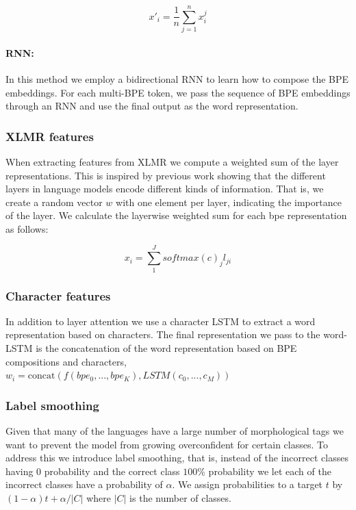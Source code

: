 \documentclass[11pt]{article}
\begin{document}
	\begin{equation}
	x'_{i} = \frac{1}{n}\sum_{j=1}^{n} x_i^j
	\end{equation}
	
	
	\paragraph{RNN:} In this method we employ a bidirectional RNN to learn how to compose the BPE embeddings. For each multi-BPE token, we pass the sequence of BPE embeddings through an RNN and use the final output as the word representation.
	
	\subsubsection{XLMR features}
	
	When extracting features from XLMR we compute a weighted sum of the layer representations. This is inspired by previous work showing that the different layers in language models encode different kinds of information. That is, we create a random vector $w$ with one element per layer, indicating the importance of the layer. We calculate the layerwise weighted sum for each bpe representation as follows:
	
	\begin{equation}
		x_i = \sum_{1}^{J} softmax(c)_j l_{ji}
	\end{equation}
	
	\subsubsection{Character features}
	In addition to layer attention we use a character LSTM to extract a word representation based on characters. The final representation we pass to the word-LSTM is the concatenation of the word representation based on BPE compositions and characters, $w_i = \text{concat}(f(bpe_0,...,bpe_K), LSTM(c_0, ..., c_M))$
	
	\subsubsection{Label smoothing}
	Given that many of the languages have a large number of morphological tags we want to prevent the model from growing overconfident for certain classes. To address this we introduce label smoothing, that is, instead of the incorrect classes having 0 probability and the correct class $100\%$ probability we let each of the incorrect classes have a probability of $\alpha$. We assign probabilities to a target $t$ by $(1-\alpha)t + \alpha / |C|$ where $|C|$ is the number of classes. 
	
\end{document}
